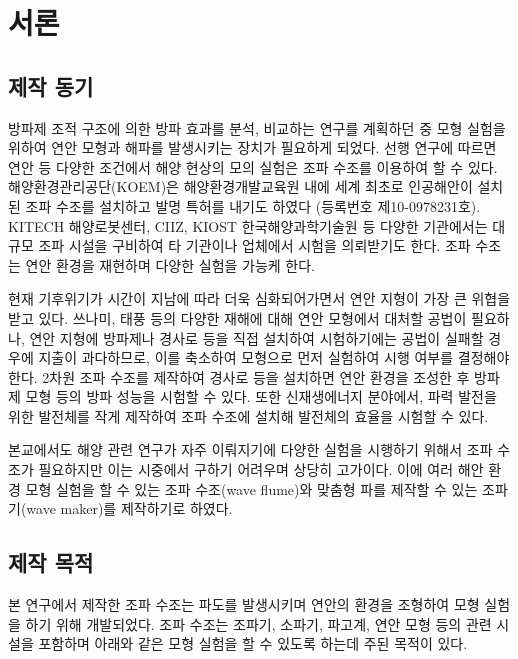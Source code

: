 \section{서론}


\subsection{제작 동기}

방파제 조적 구조에 의한 방파 효과를 분석, 비교하는 연구를 계획하던 중 모형 실험을 위하여 연안 모형과 해파를 발생시키는 장치가 필요하게 되었다. 선행 연구에 따르면 연안 등 다양한 조건에서 해양 현상의 모의 실험은 조파 수조를 이용하여 할 수 있다\cite{chung2013}. 해양환경관리공단(KOEM)은 해양환경개발교육원 내에 세계 최초로 인공해안이 설치된 조파 수조를 설치하고 발명 특허를 내기도 하였다 (등록번호 제10-0978231호). KITECH 해양로봇센터, CIIZ, KIOST 한국해양과학기술원 등 다양한 기관에서는 대규모 조파 시설을 구비하여 타 기관이나 업체에서 시험을 의뢰받기도 한다. 조파 수조는 연안 환경을 재현하며 다양한 실험을 가능케 한다.

현재 기후위기가 시간이 지남에 따라 더욱 심화되어가면서 연안 지형이 가장 큰 위협을 받고 있다\cite{bini2021climate}. 쓰나미, 태풍 등의 다양한 재해에 대해 연안 모형에서 대처할 공법이 필요하나, 연안 지형에 방파제나 경사로 등을 직접 설치하여 시험하기에는 공법이 실패할 경우에 지출이 과다하므로, 이를 축소하여 모형으로 먼저 실험하여 시행 여부를 결정해야 한다. 2차원 조파 수조를 제작하여 경사로 등을 설치하면 연안 환경을 조성한 후 방파제 모형 등의 방파 성능을 시험할 수 있다. 또한 신재생에너지 분야에서, 파력 발전을 위한 발전체를 작게 제작하여 조파 수조에 설치해 발전체의 효율을 시험할 수 있다.

본교에서도 해양 관련 연구가 자주 이뤄지기에 다양한 실험을 시행하기 위해서 조파 수조가 필요하지만 이는 시중에서 구하기 어려우며 상당히 고가이다. 이에 여러 해안 환경 모형 실험을 할 수 있는 조파 수조(wave flume)와 맞춤형 파를 제작할 수 있는 조파기(wave maker)를 제작하기로 하였다. 


\subsection{제작 목적}

본 연구에서 제작한 조파 수조는 파도를 발생시키며 연안의 환경을 조형하여 모형 실험을 하기 위해 개발되었다. 조파 수조는 조파기, 소파기, 파고계, 연안 모형 등의 관련 시설을 포함하며 아래와 같은 모형 실험을 할 수 있도록 하는데 주된 목적이 있다.

